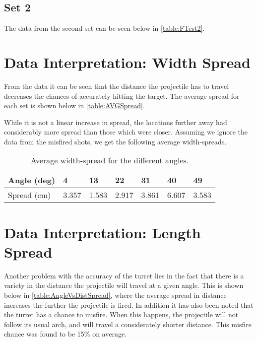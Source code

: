 \subsection{Set 2}
The data from the second set can be seen below in \autoref{table:FTest2}. 

\section{Data Interpretation: Width Spread}
From the data it can be seen that the distance the projectile has to travel
decreases the chances of accurately hitting the target. The average spread for
each set is shown below in \autoref{table:AVGSpread}.


While it is not a linear increase in spread, the locations further away had
considerably more spread than those which were closer. Assuming we
ignore the data from the misfired shots, we get the following average width-spreads. 

\begin{table}[H]
\centering
\begin{tabular}{|l|l|l|l|l|l|l|}
\hline
Angle (deg) & 4     & 13    & 22    & 31    & 40    & 49    \\ \hline
Spread (cm) & 3.357 & 1.583 & 2.917 & 3.861 & 6.607 & 3.583 \\ \hline
\end{tabular}
\caption{Average width-spread for the different angles.}
\end{table}

\section{Data Interpretation: Length Spread}
Another problem with the accuracy of the turret lies in the fact that there is a
variety in the distance the projectile will travel at a given angle. This is shown below in
\autoref{table:AngleVsDistSpread}, where the average spread in distance
increases the further the projectile is fired. In addition it has also been
noted that the turret has a chance to misfire. When this happens, the projectile will not
follow its usual arch, and will travel a considerately shorter distance. This
misfire chance was found to be 15\% on average.


